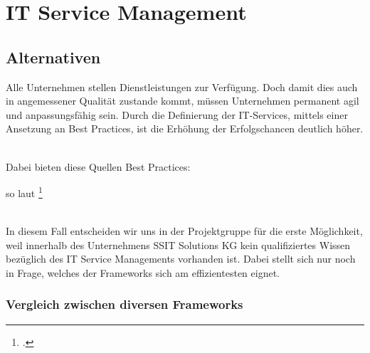 \chapter{IT Service Management}
\label{chap: IT Service Management}

\section{Alternativen}
\label{chap: Moeglichkeiten zur Servicedefinierung}

Alle Unternehmen stellen Dienstleistungen zur Verfügung. Doch damit dies auch in angemessener Qualität zustande kommt, 
müssen Unternehmen permanent agil und anpassungsfähig sein. Durch die Definierung der IT-Services, mittels einer Ansetzung an Best Practices, 
ist die Erhöhung der Erfolgschancen deutlich höher.
\

Dabei bieten diese Quellen Best Practices:

\begin{quote}
\end{quote}

so laut \footcite[][Kap.\ 1.1, S.\ 1]{ITIL}

\noindent
\\
In diesem Fall entscheiden wir uns in der Projektgruppe für die erste Möglichkeit,
weil innerhalb des Unternehmens SSIT Solutions KG kein qualifiziertes
 Wissen bezüglich des IT Service Managements vorhanden ist.
 Dabei stellt sich nur noch in Frage, welches der Frameworks sich am effizientesten eignet.

\subsection{Vergleich zwischen diversen Frameworks}
\label{chap: Vergleich Frameworks}

